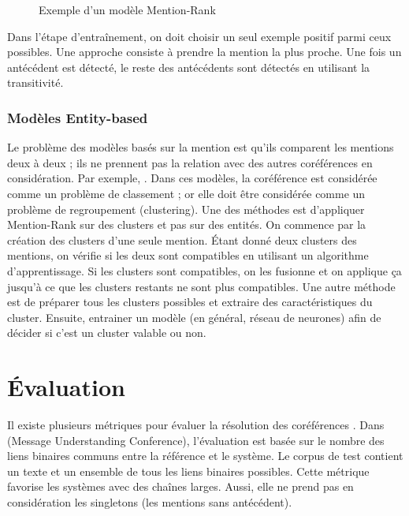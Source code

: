 \documentclass{KodeBook}
\begin{document}
\begin{figure}[ht]
	\centering
	\caption[Exemple d'un modèle Mention-Rank]{Exemple d'un modèle Mention-Rank \cite{2019-jurafsky-martin}}
	\label{fig:mention-rank-exp}
\end{figure}

Dans l'étape d'entraînement, on doit choisir un seul exemple positif parmi ceux possibles. 
Une approche consiste à prendre la mention la plus proche.
Une fois un antécédent est détecté, le reste des antécédents sont détectés en utilisant la transitivité. 

\subsubsection{Modèles Entity-based}

Le problème des modèles basés sur la mention est qu'ils comparent les mentions deux à deux ; ils ne prennent pas la relation avec des autres coréférences en considération.
Par exemple, .
Dans ces modèles, la coréférence est considérée comme un problème de classement ; or elle doit être considérée comme un problème de regroupement (clustering). 
Une des méthodes est d'appliquer Mention-Rank sur des clusters et pas sur des entités. 
On commence par la création des clusters d'une seule mention. 
Étant donné deux clusters des mentions, on vérifie si les deux sont compatibles en utilisant un algorithme d'apprentissage.
Si les clusters sont compatibles, on les fusionne et on applique ça jusqu'à ce que les clusters restants ne sont plus compatibles.
Une autre méthode est de préparer tous les clusters possibles et extraire des caractéristiques du cluster.
Ensuite, entrainer un modèle (en général, réseau de neurones) afin de décider si c'est un cluster valable ou non.

\section{Évaluation}

Il existe plusieurs métriques pour évaluer la résolution des coréférences \cite{2016-moosavi-strube}.
Dans  (Message Understanding Conference), l'évaluation est basée sur le nombre des liens binaires communs entre la référence et le système.
Le corpus de test contient un texte et un ensemble de tous les liens binaires possibles. 
Cette métrique favorise les systèmes avec des chaînes larges. 
Aussi, elle ne prend pas en considération les singletons (les mentions sans antécédent).
\end{document}

